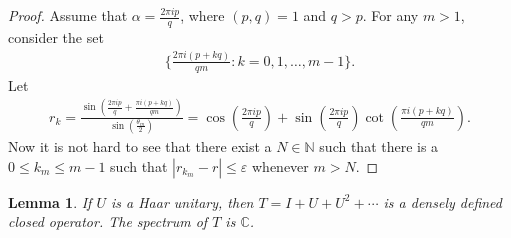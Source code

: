 \documentclass[a4paper,10pt]{amsart}
\newtheorem{lemma}{Lemma}[section]
\newcommand{\C}{\mathbb C} %
\newcommand{\N}{\mathbb N} %
\begin{document}
\begin{proof}
    Assume that $\alpha = \frac{2\pi i p}{q}$, where $(p, q) = 1$ and 
    $q > p$. For any $m > 1$, consider the set
    \begin{align*}
        \{\frac{2\pi i (p + kq)}{qm} : k = 0, 1, \ldots, m-1 \}. 
    \end{align*}
    Let  
    \begin{align*}
        r_{k} = \frac{\sin (\frac{2\pi i p}{q}+ 
        \frac{\pi i (p + kq)}{qm})}
        {\sin (\frac{\theta_m}{2})}
     = \cos (\frac{2\pi i p}{q}) + \sin (\frac{2\pi i p}{q})
     \cot (\frac{\pi i (p + kq)}{qm}).
    \end{align*}
    Now it is not hard to see that there exist a $N \in \N$ such that
    there is a $0 \leq k_m \leq m-1$ such that 
    $|r_{k_m} - r| \leq \varepsilon$ whenever $m > N$. 
\end{proof}

\begin{lemma}
    If $U$ is a Haar unitary, then $T = I + U + U^{2} + \cdots $ is a 
    densely defined closed operator. The spectrum of $T$ is $\C$.
\end{lemma}


%

%

\end{document}
